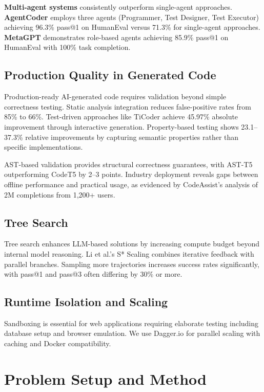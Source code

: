 \documentclass{article}
\begin{document}
\textbf{Multi-agent systems} consistently outperform single-agent approaches. \textbf{AgentCoder} \citep{huang2023agentcoder} employs three agents (Programmer, Test Designer, Test Executor) achieving 96.3\% pass@1 on HumanEval versus 71.3\% for single-agent approaches. \textbf{MetaGPT} \citep{hong2023metagpt} demonstrates role-based agents achieving 85.9\% pass@1 on HumanEval with 100\% task completion.

\subsection{Production Quality in Generated Code}

Production-ready AI-generated code requires validation beyond simple correctness testing. Static analysis integration reduces false-positive rates from 85\% to 66\%. Test-driven approaches like TiCoder achieve 45.97\% absolute improvement through interactive generation. Property-based testing shows 23.1--37.3\% relative improvements by capturing semantic properties rather than specific implementations.

AST-based validation provides structural correctness guarantees, with AST-T5 outperforming CodeT5 by 2--3 points. Industry deployment reveals gaps between offline performance and practical usage, as evidenced by CodeAssist's analysis of 2M completions from 1,200+ users.

\subsection{Tree Search}

Tree search enhances LLM-based solutions by increasing compute budget beyond internal model reasoning. Li et al.'s S* Scaling \citep{li2025s} combines iterative feedback with parallel branches. Sampling more trajectories increases success rates significantly, with pass@1 and pass@3 often differing by 30\% or more.

\subsection{Runtime Isolation and Scaling}
Sandboxing is essential for web applications requiring elaborate testing including database setup and browser emulation. We use Dagger.io for parallel scaling with caching and Docker compatibility.

\section{Problem Setup and Method}
\label{sec:method}
\end{document}

